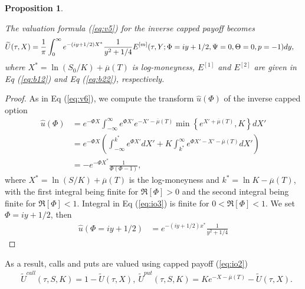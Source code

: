 \documentclass[pdftex,11pt,a4paper] {article}
\newtheorem{proposition}{Proposition}[section]
\begin{document}
\begin{proposition} \label{invopt}

The valuation formula (\ref{eq:v5}) for the inverse capped payoff becomes
\begin{equation} \label{eq:io5}
\begin{split}
   \widetilde{U}(\tau, X)&  =  \frac{1}{\pi}  \int^{\infty}_{0} e^{-(iy+1/2) X^{*}}  \frac{1}{y^{2}+1/4} E^{[m]}(\tau,Y; \Phi=iy+1/2,\Psi=0, \Theta=0, p=-1)dy,\vspace*{-1.0\baselineskip}
\end{split}
\end{equation}
where $X^{*}=\ln(S_{0}/K)+\overline{\mu}(T)$ is log-moneyness, $E^{[1]}$ and $E^{[2]}$ are given in Eq (\ref{eq:b12}) and Eq (\ref{eq:b22}), respectively.

\end{proposition}


\begin{proof}
As in Eq (\ref{eq:v6}), we compute the transform $\widehat{u}(\Phi)$ of the inverse capped option
\begin{equation} \label{eq:io3}
\begin{split}
   \widehat{u}(\Phi) & =  e^{-\Phi X}\int^{\infty}_{-\infty}e^{\Phi X'} e^{-X'-\overline{\mu}(T)} \min\left\{e^{ X'+\overline{\mu}(T)},K\right\}  dX'  \\
	& = e^{-\Phi X} \left(\int^{k^{*}}_{-\infty}e^{\Phi X'}  dX' +K  \int^{\infty}_{k^{*}}e^{\Phi X'-X'-\overline{\mu}(T)}  dX'\right)\\
	& =  -e^{-\Phi X^{*}}\frac{1}{\Phi(\Phi-1)},
\end{split} 
\end{equation}
where $X^{*}=\ln(S/K)+\overline{\mu}(T)$ is the log-moneyness and $k^{*}=\ln K-\overline{\mu}(T)$, with the first integral being finite for $\Re[\Phi]>0$ and the second integral being finite for $\Re[\Phi]<1$. Integral in Eq (\ref{eq:io3}) is finite for $0<\Re[\Phi]<1$. We set $\Phi = iy+1/2$, then
\begin{equation} \label{eq:io4}
\begin{split}
   \widehat{u}(\Phi = iy+1/2) & =  e^{-(iy+1/2) x^{*}}  \frac{1}{y^{2}+1/4}
\end{split}
\end{equation}
\end{proof}




As a result, calls and puts are valued using capped payoff (\ref{eq:io2})
\begin{equation} \label{eq:io6}
\begin{split}
&\widetilde{U}^{call}(\tau, S,K) =1- \widetilde{U}(\tau, X), \ \widetilde{U}^{put}(\tau, S,K)=K e^{-X-\overline{\mu}(T)} - \widetilde{U}(\tau, X).
\end{split} 
\end{equation}
\end{document}
